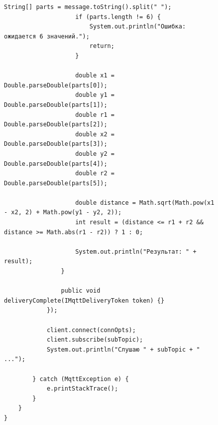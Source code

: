 \documentclass[a4paper, 14pt]{extarticle}
\begin{document}
\begin{figure}[!htb]
\begin{lstlisting}[language={},caption={Консольная реализация},label={lst:code2}]
                    String[] parts = message.toString().split(" ");
                    if (parts.length != 6) {
                        System.out.println("Ошибка: ожидается 6 значений.");
                        return;
                    }

                    double x1 = Double.parseDouble(parts[0]);
                    double y1 = Double.parseDouble(parts[1]);
                    double r1 = Double.parseDouble(parts[2]);
                    double x2 = Double.parseDouble(parts[3]);
                    double y2 = Double.parseDouble(parts[4]);
                    double r2 = Double.parseDouble(parts[5]);

                    double distance = Math.sqrt(Math.pow(x1 - x2, 2) + Math.pow(y1 - y2, 2));
                    int result = (distance <= r1 + r2 && distance >= Math.abs(r1 - r2)) ? 1 : 0;

                    System.out.println("Результат: " + result);
                }

                public void deliveryComplete(IMqttDeliveryToken token) {}
            });

            client.connect(connOpts);
            client.subscribe(subTopic);
            System.out.println("Слушаю " + subTopic + " ...");

        } catch (MqttException e) {
            e.printStackTrace();
        }
    }
}



\end{lstlisting}
\end{figure}
\newpage
\end{document}
